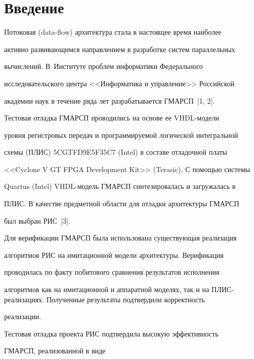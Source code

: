  \thispagestyle{headings}

 


  

  

\section{Введение}



  Потоковая (data-flow) архитектура стала в настоящее время наиболее 

активно развивающимся направлением в разработке систем параллельных 

вычислений. В~Институте проблем информатики Федерального 

исследовательского центра <<Информатика и управление>> Российской 

академии наук в течение ряда лет разрабатывается ГМАРСП~[1, 2].

   

  Тестовая отладка ГМАРСП проводились на основе ее VHDL-модели 

уровня регистровых передач и программируемой логической интегральной 

схемы (ПЛИС) 5CGTFD9E5F35C7 (Intel) в составе отладочной платы 

<<Cyclone V GT FPGA Development Kit>> (Terasic). С помощью системы 

Quartus (Intel) VHDL-мо\-дель ГМАРСП синтезировалась и загружалась в 

ПЛИС. В качестве предметной области для отладки архитектуры ГМАРСП 

был выбран РИС~[3].

  

  Для верификации ГМАРСП была использована существующая реализация 

алгоритмов РИС на имитационной модели архитектуры. Верификация 

проводилась по факту побитового сравнения результатов исполнения 

алгоритмов как на имитационной и аппаратной моделях, так и на ПЛИС-ре\-а\-ли\-за\-ци\-ях. Полученные результаты подтвердили корректность 

реализации.

  

  Тестовая отладка проекта РИС подтвердила высокую эффективность 

\mbox{ГМАРСП}, реализованной в виде  

